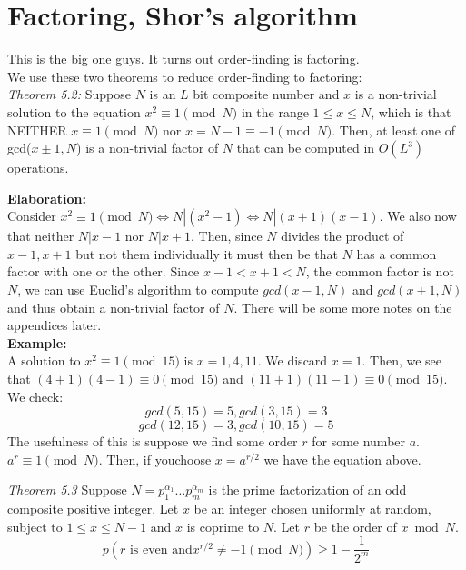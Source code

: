 \documentclass{article}
\begin{document}
\section{Factoring, Shor's algorithm}
This is the big one guys. It turns out order-finding is factoring.\\
We use these two theorems to reduce order-finding to factoring:\\
\textit{Theorem 5.2:} Suppose $N$ is an $L$ bit composite number and $x$ is a non-trivial solution to the equation $x^2 \equiv 1 \pmod{N}$ in the range $1\leq x \leq N$, which is that NEITHER $x \equiv 1 \pmod{N}$ nor $x = N-1 \equiv -1 \pmod{N}$. Then, at least one of gcd($x\pm1, N$) is a non-trivial factor of $N$ that can be computed in $O(L^3)$ operations.
\begin{tcolorbox}\textbf{Elaboration:}\\
	Consider $x^2 \equiv 1 \pmod{N} \iff N | (x^2-1) \iff N | (x+1)(x-1)$. We also now that neither $N| x-1$ nor $N|x+1$. 
Then, since $N$ divides the product of $x-1, x+1$ but not them individually it must then be that $N$ has a common factor with one or the other. Since $x-1 < x+1 < N$, the common factor is not $N$, we can use Euclid's algorithm to compute $gcd(x-1, N)$ and $gcd(x+1, N)$ and thus obtain a non-trivial factor of $N$. There will be some more notes on the appendices later.\\
\textbf{Example:}\\
A solution to $x^2 \equiv 1 \pmod{15}$ is $x=1,4,11$. We discard $x=1$. Then, we see that $(4+1)(4-1) \equiv 0 \pmod{15}$ and $(11+1)(11-1) \equiv 0 \pmod{15}$. We check:
$$gcd(5,15) = 5, gcd (3, 15) = 3$$
$$gcd(12,15) = 3, gcd (10,15)= 5$$
The usefulness of this is suppose we find some order $r$ for some number $a$. $a^r \equiv 1 \pmod{N}$. Then, if youchoose $x=a^{r/2}$ we have the equation above. 
\end{tcolorbox}
\textit{Theorem 5.3} Suppose $N = p_1^{\alpha_1} \dots p_m^{\alpha_m}$ is the prime factorization of an odd composite positive integer. Let $x$ be an integer chosen uniformly at random, subject to $1\leq x\leq N-1$ and $x$ is coprime to $N$. Let $r$ be the order of $x \bmod N$. $$p(r \text{ is even and} x^{r/2} \neq -1 \pmod{N}) \geq 1 - \frac{1}{2^m} $$
\end{document}
